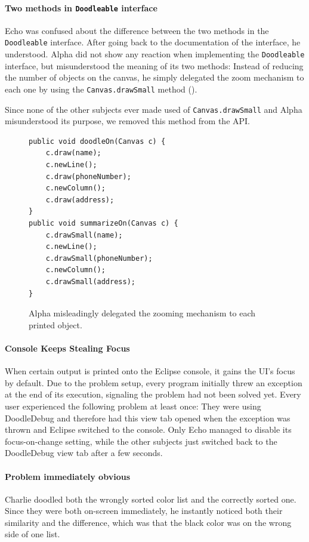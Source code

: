 \documentclass[english]{scrartcl}
\newcommand{\DD}{Dood\-le\-De\-bug\xspace}
\begin{document}
\paragraph{Two methods in \texttt{Doodleable} interface}
Echo was confused about the difference between the two methods in the \texttt{Doodleable} interface. After going back to the documentation of the interface, he understood.
Alpha did not show any reaction when implementing the \texttt{Doodleable} interface, but misunderstood the meaning of its two methods: Instead of reducing the number of objects on the canvas, he simply delegated the zoom mechanism to each one by using the \texttt{Canvas.drawSmall} method ().

Since none of the other subjects ever made used of \texttt{Canvas.drawSmall} and Alpha misunderstood its purpose, we removed this method from the API.

\begin{figure}[h]
\begin{lstlisting}
public void doodleOn(Canvas c) {
	c.draw(name);
	c.newLine();
	c.draw(phoneNumber);
	c.newColumn();
	c.draw(address);
}
public void summarizeOn(Canvas c) {
	c.drawSmall(name);
	c.newLine();
	c.drawSmall(phoneNumber);
	c.newColumn();
	c.drawSmall(address);
}
\end{lstlisting}
  \caption{Alpha misleadingly delegated the zooming mechanism to each printed object.}
\end{figure}

\paragraph{Console Keeps Stealing Focus}
When certain output is printed onto the Eclipse console, it gains the UI's focus by default.
Due to the problem setup, every program initially threw an exception at the end of its execution, signaling the problem had not been solved yet.
Every user experienced the following problem at least once: They were using \DD and therefore had this view tab opened when the exception was thrown and Eclipse switched to the console.
Only Echo managed to disable its focus-on-change setting, while the other subjects just switched back to the \DD view tab after a few seconds.

\paragraph{Problem immediately obvious}
Charlie doodled both the wrongly sorted color list and the correctly sorted one. Since they were both on-screen immediately, he instantly noticed both their similarity and the difference, which was that the black color was on the wrong side of one list.
\end{document}
